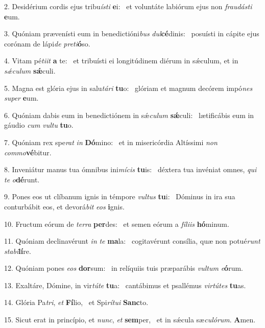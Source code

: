 2. Desidérium cordis ejus tribu\textit{ís}\textit{ti} \textbf{e}i: \ast\  et voluntáte labiórum ejus non \textit{frau}\textit{dás}\textit{ti} \textbf{e}um.\

3. Quóniam prævenísti eum in benedictióni\textit{bus} \textit{dul}\textbf{cé}dinis: \ast\  posuísti in cápite ejus corónam de lápi\textit{de} \textit{pre}\textit{ti}\textbf{ó}so.\

4. Vitam pé\textit{ti}\textit{it} \textbf{a} te: \ast\  et tribuísti ei longitúdinem diérum in sǽculum, et in \textit{sǽ}\textit{cu}\textit{lum} \textbf{sǽ}culi.\

5. Magna est glória ejus in salu\textit{tá}\textit{ri} \textbf{tu}o: \ast\  glóriam et magnum decórem impó\textit{nes} \textit{su}\textit{per} \textbf{e}um.\

6. Quóniam dabis eum in benedictiónem in sǽ\textit{cu}\textit{lum} \textbf{sǽ}culi: \ast\  lætificábis eum in gáudio \textit{cum} \textit{vul}\textit{tu} \textbf{tu}o.\

7. Quóniam rex spe\textit{rat} \textit{in} \textbf{Dó}mino: \ast\  et in misericórdia Altíssimi \textit{non} \textit{com}\textit{mo}\textbf{vé}bitur.\

8. Inveniátur manus tua ómnibus ini\textit{mí}\textit{cis} \textbf{tu}is: \ast\  déxtera tua invéniat omnes, \textit{qui} \textit{te} \textit{o}\textbf{dé}runt.\

9. Pones eos ut clíbanum ignis in témpore \textit{vul}\textit{tus} \textbf{tu}i: \ast\  Dóminus in ira sua conturbábit eos, et devorá\textit{bit} \textit{e}\textit{os} \textbf{i}gnis.\

10. Fructum eórum de \textit{ter}\textit{ra} \textbf{per}des: \ast\  et semen eórum a \textit{fí}\textit{li}\textit{is} \textbf{hó}minum.\

11. Quóniam declinavérunt \textit{in} \textit{te} \textbf{ma}la: \ast\  cogitavérunt consília, quæ non potué\textit{runt} \textit{sta}\textit{bi}\textbf{lí}re.\

12. Quóniam pones \textit{e}\textit{os} \textbf{dor}sum: \ast\  in relíquiis tuis præparábis \textit{vul}\textit{tum} \textit{e}\textbf{ó}rum.\

13. Exaltáre, Dómine, in vir\textit{tú}\textit{te} \textbf{tu}a: \ast\  cantábimus et psallémus \textit{vir}\textit{tú}\textit{tes} \textbf{tu}as.\

14. Glória Pa\textit{tri}, \textit{et} \textbf{Fí}lio, \ast\  et Spi\textit{rí}\textit{tu}\textit{i} \textbf{Sanc}to.\

15. Sicut erat in princípio, et \textit{nunc}, \textit{et} \textbf{sem}per, \ast\  et in sǽcula sæ\textit{cu}\textit{ló}\textit{rum}. \textbf{A}men.\

